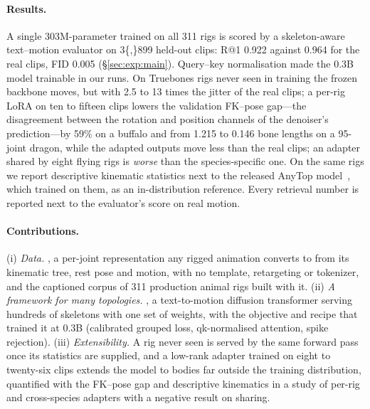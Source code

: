 \paragraph{Results.} A single \num{303}M-parameter \method{} trained on all \num{311} rigs is
scored by a skeleton-aware text--motion evaluator on \num{3{,}899} held-out clips: R@1 \num{0.922}
against \num{0.964} for the real clips, FID \num{0.005} (\S\ref{sec:exp:main}). Query--key normalisation
made the 0.3B model trainable in our runs. On Truebones rigs never seen in training the frozen
backbone moves, but with \num{2.5} to \num{13} times the jitter of the real clips; a per-rig LoRA on
ten to fifteen clips lowers the validation FK--pose gap---the disagreement between the rotation and
position channels of the denoiser's prediction---by \num{59}\% on a buffalo and from \num{1.215}
to \num{0.146} bone lengths on a 95-joint dragon, while the adapted outputs move less than the real
clips; an adapter shared by eight flying rigs is \emph{worse} than the species-specific one. On the
same rigs we report descriptive kinematic statistics next to the released AnyTop
model~\citep{gat2025anytop}, which trained on them, as an in-distribution reference. Every
retrieval number is reported next to the evaluator's score on real motion.

\paragraph{Contributions.} (i) \emph{Data.} \rep{}, a per-joint representation any rigged
animation converts to from its kinematic tree, rest pose and motion, with no template, retargeting
or tokenizer, and the captioned corpus of \num{311} production animal rigs built with it.
(ii) \emph{A framework for many topologies.} \method{}, a text-to-motion diffusion transformer
serving hundreds of skeletons with one set of weights, with the objective and recipe that trained
it at 0.3B (calibrated grouped loss, qk-normalised attention, spike rejection).
(iii) \emph{Extensibility.} A rig never seen is served by the same forward pass once its statistics
are supplied, and a low-rank adapter trained on eight to twenty-six clips extends the model to bodies far outside the training
distribution, quantified with the FK--pose gap and descriptive kinematics in a study of per-rig and
cross-species adapters with a negative result on sharing.
